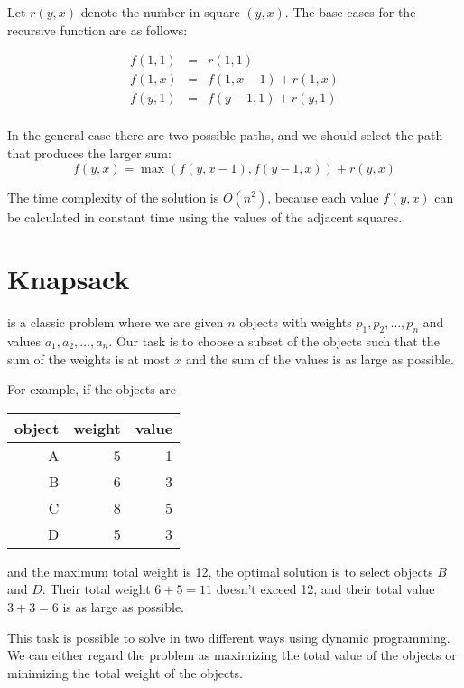 Let $r(y,x)$ denote the number in square $(y,x)$.
The base cases for the recursive function
are as follows:

\[
\begin{array}{lcl}
f(1,1) & = & r(1,1) \\
f(1,x) & = & f(1,x-1)+r(1,x) \\
f(y,1) & = & f(y-1,1)+r(y,1)\\
\end{array}
\]

In the general case there are two
possible paths, and we should select the path
that produces the larger sum:
\[ f(y,x) = \max(f(y,x-1),f(y-1,x))+r(y,x)\]

The time complexity of the solution is $O(n^2)$,
because each value $f(y,x)$ can be calculated
in constant time using the values of the
adjacent squares.

\section{Knapsack}


 is a classic problem where we
are given $n$ objects with weights
$p_1,p_2,\ldots,p_n$ and values
$a_1,a_2,\ldots,a_n$.
Our task is to choose a subset of the objects
such that the sum of the weights is at most $x$
and the sum of the values is as large as possible.

\begin{samepage}
For example, if the objects are
\begin{center}
\begin{tabular}{rrr}
object & weight & value \\
\hline
A & 5 & 1 \\
B & 6 & 3 \\
C & 8 & 5 \\
D & 5 & 3 \\
\end{tabular}
\end{center}
\end{samepage}
and the maximum total weight is 12,
the optimal solution is to select objects $B$ and $D$.
Their total weight $6+5=11$ doesn't exceed 12,
and their total value $3+3=6$ is as large as possible.

This task is possible to solve in two different ways
using dynamic programming.
We can either regard the problem as maximizing the
total value of the objects or 
minimizing the total weight of the objects.

